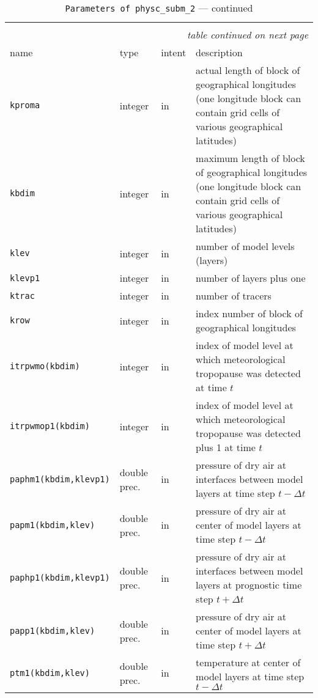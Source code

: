\begin{longtable}{l@{\extracolsep\fill}llp{7.0cm}}
\hline\hline\caption[Parameters of {\tt physc\_subm\_2}]{Parameter list
  of arguments passed to {\tt physc\_subm\_2}}\\\hline\label{tabphysc_subm_2}
\endfirsthead
\caption[]{{\tt Parameters of {\tt physc\_subm\_2}} --- continued}\\\hline
\endhead
\hline\multicolumn{4}{r}{\slshape table continued on next page}\\
\endfoot
\hline %
\endlastfoot
name & type & intent & description \\\hline
{\tt kproma} & integer & in & actual length of
block of geographical longitudes (one longitude block can contain grid
cells of various geographical latitudes)\\
{\tt kbdim} &  integer & in & maximum length of block of
geographical longitudes (one longitude block can contain grid cells of
various geographical latitudes)\\
{\tt klev} &  integer & in & number of model levels (layers)\\
{\tt klevp1} &  integer & in & number of layers plus one \\
{\tt ktrac} &  integer & in & number of tracers \\
{\tt krow} &  integer & in & index number of block of geographical
longitudes\\ 
{\tt itrpwmo(kbdim)} & integer & in & index of model level at which
meteorological tropopause was detected at time $t$ \\
{\tt itrpwmop1(kbdim)} & integer & in & index of model level at which
meteorological tropopause was detected plus 1 at time $t$ \\
{\tt paphm1(kbdim,klevp1)} & double prec. & in & pressure of dry air at
interfaces between model layers at time step $t-\Delta t$\\
{\tt papm1(kbdim,klev)} & double prec. & in & pressure of dry air at center of model
layers at time step $t-\Delta t$\\
{\tt paphp1(kbdim,klevp1)} & double prec. & in & pressure of dry air at
interfaces between model layers at prognostic time step $t+\Delta t$\\
{\tt papp1(kbdim,klev)} & double prec. & in & pressure of dry air at center of model
layers at time step $t+\Delta t$\\
{\tt ptm1(kbdim,klev)} & double prec. & in & temperature at center of
model layers at time step $t-\Delta t$\\

\end{longtable}
